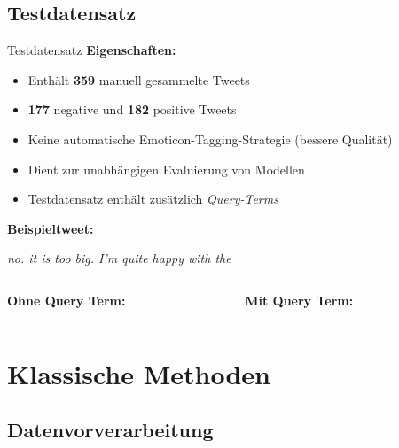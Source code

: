 \documentclass[aspectratio=169]{beamer} %
\begin{document}
\subsection{Testdatensatz}
\begin{frame}{Testdatensatz}
  \textbf{Eigenschaften:}
  \begin{itemize}
      \item Enthält \textbf{359} manuell gesammelte Tweets
      \item \textbf{177} negative und \textbf{182} positive Tweets
      \item Keine automatische Emoticon-Tagging-Strategie (bessere Qualität)
      \item Dient zur unabhängigen Evaluierung von Modellen
      \item Testdatensatz enthält zusätzlich \textit{Query-Terms}
  \end{itemize}

  \vspace{0.5cm}
  \textbf{Beispieltweet:}


  \begin{center}
    \glqq \textit{no. it is too big. I'm quite happy with the \grqq}
    \vspace{0.25cm}
    \begin{columns}
        \begin{column}{0.45\textwidth}
            \textbf{Ohne Query Term: }
        \end{column}
        \begin{column}{0.45\textwidth}
            \textbf{Mit Query Term: }
        \end{column}
    \end{columns}
  \end{center}
\end{frame}



\section{Klassische Methoden}

\subsection{Datenvorverarbeitung}
\end{document}
